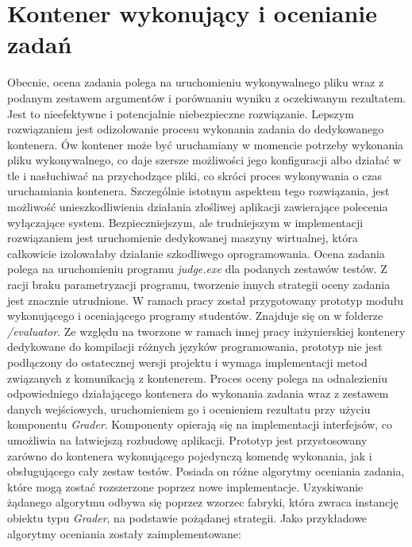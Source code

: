 \section{Kontener wykonujący i ocenianie zadań}
Obecnie, ocena zadania polega na uruchomieniu wykonywalnego pliku wraz z podanym zestawem argumentów i porównaniu wyniku z oczekiwanym rezultatem. Jest to nieefektywne i potencjalnie niebezpieczne rozwiązanie. Lepszym rozwiązaniem jest odizolowanie procesu wykonania zadania do dedykowanego kontenera. Ów kontener może być uruchamiany w momencie potrzeby wykonania pliku wykonywalnego, co daje szersze możliwości jego konfiguracji albo działać w tle i nasłuchiwać na przychodzące pliki, co skróci proces wykonywania o czas uruchamiania kontenera. Szczególnie istotnym aspektem tego rozwiązania, jest możliwość unieszkodliwienia działania złośliwej aplikacji zawierające polecenia wyłączające system. Bezpieczniejszym, ale trudniejszym w implementacji rozwiązaniem jest uruchomienie dedykowanej maszyny wirtualnej, która całkowicie izolowałaby działanie szkodliwego oprogramowania. 
\newline \indent Ocena zadania polega na uruchomieniu programu \textit{judge.exe} dla podanych zestawów testów. Z racji braku parametryzacji programu, tworzenie innych strategii oceny zadania jest znacznie utrudnione.
\newline \indent W ramach pracy został przygotowany prototyp modułu wykonującego i oceniającego programy studentów. Znajduje się on w folderze \textit{/evaluator}. Ze względu na tworzone w ramach innej pracy inżynierskiej kontenery dedykowane do kompilacji różnych języków programowania, prototyp nie jest podłączony do ostatecznej wersji projektu i wymaga implementacji metod związanych z komunikacją z kontenerem. Proces oceny polega na odnalezieniu odpowiedniego działającego kontenera do wykonania zadania wraz z zestawem danych wejściowych, uruchomieniem go i ocenieniem rezultatu przy użyciu komponentu \textit{Grader}. Komponenty opierają się na implementacji interfejsów, co umożliwia na łatwiejszą rozbudowę aplikacji. Prototyp jest przystosowany zarówno do kontenera wykonującego pojedynczą komendę wykonania, jak i obsługującego cały zestaw testów. Posiada on różne algorytmy oceniania zadania, które mogą zostać rozszerzone poprzez nowe implementacje. Uzyskiwanie żądanego algorytmu odbywa się poprzez wzorzec fabryki, która zwraca instancję obiektu typu \textit{Grader}, na podstawie pożądanej strategii. Jako przykładowe algorytmy oceniania zostały zaimplementowane:
